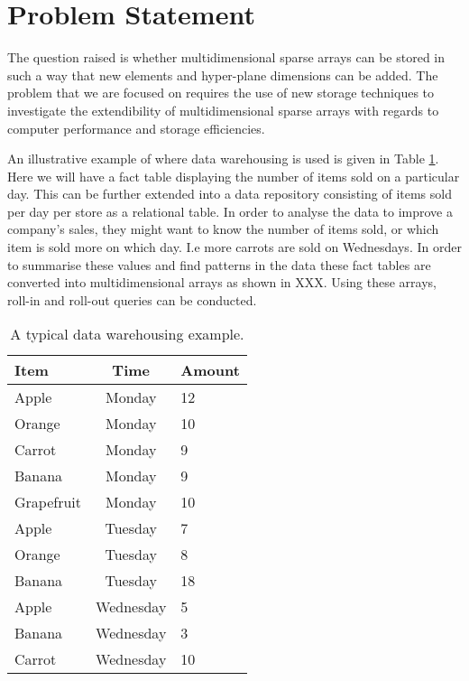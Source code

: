 \section{Problem Statement}
The question raised is whether multidimensional sparse arrays can be stored in such a way that new elements and hyper-plane dimensions can be added. The problem that we are focused on requires the use of new storage techniques to investigate the extendibility of multidimensional sparse arrays with regards to computer performance and storage efficiencies.

An illustrative example of where data warehousing is used is given in Table \ref{tab:example}. Here we will have a fact table displaying the number of items sold on a particular day. This can be further extended into a data repository consisting of items sold per day per store as a relational table. In order to analyse the data to improve a company's sales, they might want to know the number of items sold, or which item is sold more on which day. I.e more carrots are sold on Wednesdays. In order to summarise these values and find patterns in the data these fact tables are converted into multidimensional arrays as shown in XXX.  Using these arrays, roll-in and roll-out queries can be conducted. %

\begin{table}[htb]
	\caption{A typical data warehousing example.\label{tab:example}}
	\begin{center}
		\begin{tabular}{p{26mm}cp{35mm}}
			\hline
			{\textbf{Item}} & {\textbf{Time}} & {\textbf{ Amount}}\\
			\hline
			Apple   & Monday & 12 \\
			Orange  & Monday & 10\\
			Carrot  & Monday & 9\\
			Banana  & Monday & 9\\
			Grapefruit & Monday & 10\\
			Apple   & Tuesday & 7 \\
			Orange  & Tuesday & 8 \\
			Banana	& Tuesday & 18 \\
			Apple   & Wednesday & 5 \\
			Banana  & Wednesday & 3\\
			Carrot  & Wednesday & 10\\
			\hline
		\end{tabular}
	\end{center}
\end{table}

